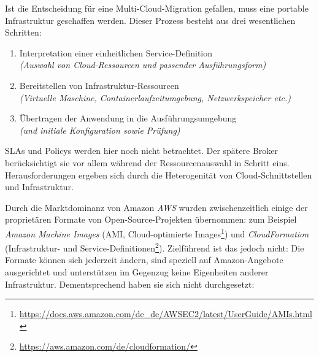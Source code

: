 Ist die Entscheidung für eine Multi-Cloud-Migration gefallen, muss eine portable Infrastruktur geschaffen werden. Dieser Prozess besteht aus drei wesentlichen Schritten:

\begin{enumerate}
	
	\item Interpretation einer einheitlichen Service-Definition
	\\\emph{(Auswahl von Cloud-Ressourcen und passender Ausführungsform)}
	
	\item Bereitstellen von Infrastruktur-Ressourcen 
	\\\emph{(Virtuelle Maschine, Containerlaufzeitumgebung, Netzwerkspeicher etc.)}
	
	\item Übertragen der Anwendung in die Ausführungsumgebung
	\\\emph{(und initiale Konfiguration sowie Prüfung)}
	
\end{enumerate}

\noindent
SLAs und Policys werden hier noch nicht betrachtet. Der spätere Broker berücksichtigt sie vor allem während der Ressourcenauswahl in Schritt eins. Herausforderungen ergeben sich durch die Heterogenität von Cloud-Schnittstellen und Infrastruktur.

Durch die Marktdominanz von Amazon \emph{AWS} wurden zwischenzeitlich einige der proprietären Formate von Open-Source-Projekten übernommen: zum Beispiel \emph{Amazon Machine Images} (AMI, Cloud-optimierte Images\footnote{\url{https://docs.aws.amazon.com/de_de/AWSEC2/latest/UserGuide/AMIs.html}}) und \emph{CloudFormation} (Infrastruktur- und Service-Definitionen\footnote{\url{https://aws.amazon.com/de/cloudformation/}}). Zielführend ist das jedoch nicht: Die Formate können sich jederzeit ändern, sind speziell auf Amazon-Angebote ausgerichtet und unterstützen im Gegenzug keine Eigenheiten anderer Infrastruktur. Dementsprechend haben sie sich nicht durchgesetzt:

